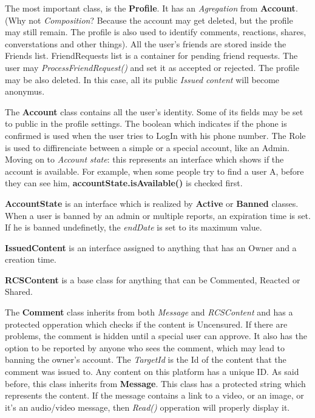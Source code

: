 \documentclass{article}
\begin{document}
			\bigskip
			The most important class, is the \textbf{Profile}. It has an \textit{Agregation} from \textbf{Account}. (Why not \textit{Composition}? Because the account may get deleted, but the profile may still remain. The profile is also used to identify comments, reactions, shares, converstations and other things). All the user's friends are stored inside the Friends list. FriendRequests list is a container for pending friend requests. The user may \textit{ProcessFriendRequest()} and set it as accepted or rejected. The profile may be also deleted. In this case, all its public \textit{Issued content} will become anonymus.

			\bigskip
			The \textbf{Account} class contains all the user's identity. Some of its fields may be set to public in the profile settings. The boolean which indicates if the phone is confirmed is used when the user tries to LogIn with his phone number. The Role is used to diffirenciate between a simple or a special account, like an Admin. Moving on to \textit{Account state}: this represents an interface which shows if the account is available. For example, when some people try to find a user A, before they can see him, \textbf{accountState.isAvailable()} is checked first.

			\bigskip
			\textbf{AccountState} is an interface which is realized by \textbf{Active} or \textbf{Banned} classes. When a user is banned by an admin or multiple reports, an expiration time is set. If he is banned undefinetly, the \textit{endDate} is set to its maximum value.

			\bigskip
			\textbf{IssuedContent} is an interface assigned to anything that has an Owner and a creation time.

			\bigskip
			\textbf{RCSContent} is a base class for anything that can be Commented, Reacted or Shared.

			\bigskip
			The \textbf{Comment} class inherits from both \textit{Message} and \textit{RCSContent} and has a protected opperation which checks if the content is Uncensured. If there are problems, the comment is hidden until a special user can approve. It also has the option to be reported by anyone who sees the comment, which may lead to banning the owner's account. The \textit{TargetId} is the Id of the content that the comment was issued to. Any content on this platform has a unique ID. As said before, this class inherits from \textbf{Message}. This class has a protected string which represents the content. If the message contains a link to a video, or an image, or it's an audio/video message, then \textit{Read()} opperation will properly display it.
\end{document}
